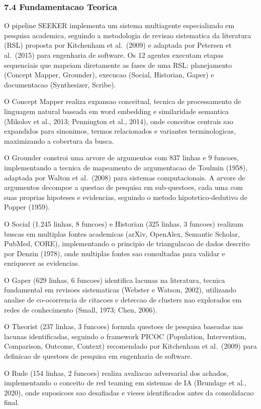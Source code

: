 \documentclass[
  12pt,
]{article}
\begin{document}
\subsubsection{7.4 Fundamentacao Teorica}\label{fundamentacao-teorica-6}

O pipeline SEEKER implementa um sistema multiagente especializado em
pesquisa academica, seguindo a metodologia de revisao sistematica da
literatura (RSL) proposta por Kitchenham et al.~(2009) e adaptada por
Petersen et al.~(2015) para engenharia de software. Os 12 agentes
executam etapas sequenciais que mapeiam diretamente as fases de uma RSL:
planejamento (Concept Mapper, Grounder), execucao (Social, Historian,
Gaper) e documentacao (Synthesizer, Scribe).

O Concept Mapper realiza expansao conceitual, tecnica de processamento
de linguagem natural baseada em word embedding e similaridade semantica
(Mikolov et al., 2013; Pennington et al., 2014), onde conceitos centrais
sao expandidos para sinonimos, termos relacionados e variantes
terminologicas, maximizando a cobertura da busca.

O Grounder constroi uma arvore de argumentos com 837 linhas e 9 funcoes,
implementando a tecnica de mapeamento de argumentacao de Toulmin (1958),
adaptada por Walton et al.~(2008) para sistemas computacionais. A arvore
de argumentos decompoe a questao de pesquisa em sub-questoes, cada uma
com suas proprias hipoteses e evidencias, seguindo o metodo
hipotetico-dedutivo de Popper (1959).

O Social (1.245 linhas, 8 funcoes) e Historian (325 linhas, 3 funcoes)
realizam buscas em multiplas fontes academicas (arXiv, OpenAlex,
Semantic Scholar, PubMed, CORE), implementando o principio de
triangulacao de dados descrito por Denzin (1978), onde multiplas fontes
sao consultadas para validar e enriquecer as evidencias.

O Gaper (629 linhas, 6 funcoes) identifica lacunas na literatura,
tecnica fundamental em revisoes sistematicas (Webster e Watson, 2002),
utilizando analise de co-ocorrencia de citacoes e deteccao de clusters
nao explorados em redes de conhecimento (Small, 1973; Chen, 2006).

O Theorist (237 linhas, 3 funcoes) formula questoes de pesquisa baseadas
nas lacunas identificadas, seguindo o framework PICOC (Population,
Intervention, Comparison, Outcome, Context) recomendado por Kitchenham
et al.~(2009) para definicao de questoes de pesquisa em engenharia de
software.

O Rude (154 linhas, 2 funcoes) realiza avaliacao adversarial dos
achados, implementando o conceito de red teaming em sistemas de IA
(Brundage et al., 2020), onde suposicoes sao desafiadas e vieses
identificados antes da consolidacao final.
\end{document}
